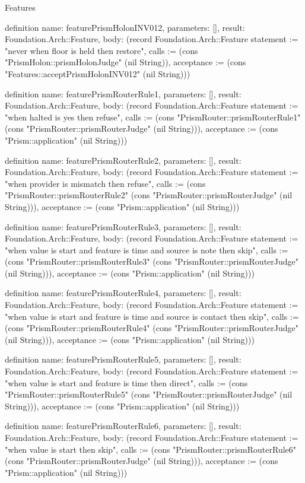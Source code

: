\begin{lexlean}{Features}
\begin{semanticmodule}
definition{
  name: featurePrismHolonINV012,
  parameters: [],
  result: Foundation.Arch::Feature,
  body: (record Foundation.Arch::Feature {statement := "never when floor is held then restore", calls := (cons "PrismHolon::prismHolonJudge" (nil String)), acceptance := (cons "Features::acceptPrismHolonINV012" (nil String))})
}

definition{
  name: featurePrismRouterRule1,
  parameters: [],
  result: Foundation.Arch::Feature,
  body: (record Foundation.Arch::Feature {statement := "when halted is yes then refuse", calls := (cons "PrismRouter::prismRouterRule1" (cons "PrismRouter::prismRouterJudge" (nil String))), acceptance := (cons "Prism::application" (nil String))})
}

definition{
  name: featurePrismRouterRule2,
  parameters: [],
  result: Foundation.Arch::Feature,
  body: (record Foundation.Arch::Feature {statement := "when provider is mismatch then refuse", calls := (cons "PrismRouter::prismRouterRule2" (cons "PrismRouter::prismRouterJudge" (nil String))), acceptance := (cons "Prism::application" (nil String))})
}

definition{
  name: featurePrismRouterRule3,
  parameters: [],
  result: Foundation.Arch::Feature,
  body: (record Foundation.Arch::Feature {statement := "when value is start and feature is time and source is note then skip", calls := (cons "PrismRouter::prismRouterRule3" (cons "PrismRouter::prismRouterJudge" (nil String))), acceptance := (cons "Prism::application" (nil String))})
}

definition{
  name: featurePrismRouterRule4,
  parameters: [],
  result: Foundation.Arch::Feature,
  body: (record Foundation.Arch::Feature {statement := "when value is start and feature is time and source is contact then skip", calls := (cons "PrismRouter::prismRouterRule4" (cons "PrismRouter::prismRouterJudge" (nil String))), acceptance := (cons "Prism::application" (nil String))})
}

definition{
  name: featurePrismRouterRule5,
  parameters: [],
  result: Foundation.Arch::Feature,
  body: (record Foundation.Arch::Feature {statement := "when value is start and feature is time then direct", calls := (cons "PrismRouter::prismRouterRule5" (cons "PrismRouter::prismRouterJudge" (nil String))), acceptance := (cons "Prism::application" (nil String))})
}

definition{
  name: featurePrismRouterRule6,
  parameters: [],
  result: Foundation.Arch::Feature,
  body: (record Foundation.Arch::Feature {statement := "when value is start then skip", calls := (cons "PrismRouter::prismRouterRule6" (cons "PrismRouter::prismRouterJudge" (nil String))), acceptance := (cons "Prism::application" (nil String))})
}


\end{semanticmodule}
\end{lexlean}
